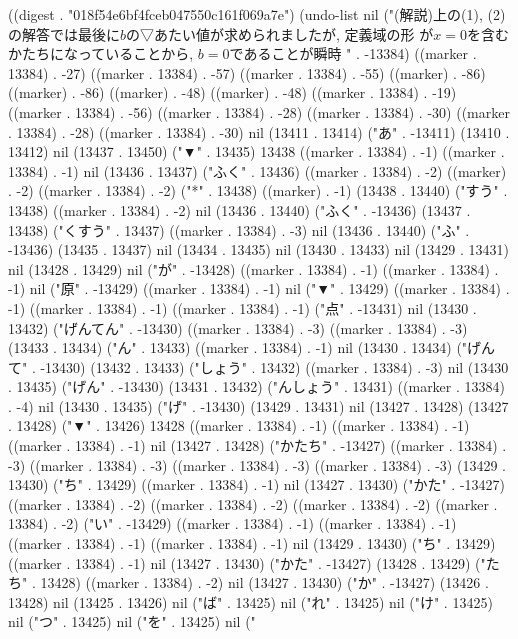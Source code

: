 
((digest . "018f54e6bf4fceb047550c161f069a7e") (undo-list nil ("(解説)上の(1), (2)の解答では最後に$b$の▽あたい値が求められましたが, 定義域の形
が$x=0$を含むかたちになっていることから, $b=0$であることが瞬時
" . -13384) ((marker . 13384) . -27) ((marker . 13384) . -57) ((marker . 13384) . -55) ((marker) . -86) ((marker) . -86) ((marker) . -48) ((marker) . -48) ((marker . 13384) . -19) ((marker . 13384) . -56) ((marker . 13384) . -28) ((marker . 13384) . -30) ((marker . 13384) . -28) ((marker . 13384) . -30) nil (13411 . 13414) ("あ" . -13411) (13410 . 13412) nil (13437 . 13450) ("▼" . 13435) 13438 ((marker . 13384) . -1) ((marker . 13384) . -1) nil (13436 . 13437) ("ふく" . 13436) ((marker . 13384) . -2) ((marker) . -2) ((marker . 13384) . -2) ("*" . 13438) ((marker) . -1) (13438 . 13440) ("すう" . 13438) ((marker . 13384) . -2) nil (13436 . 13440) ("ふく" . -13436) (13437 . 13438) ("くすう" . 13437) ((marker . 13384) . -3) nil (13436 . 13440) ("ふ" . -13436) (13435 . 13437) nil (13434 . 13435) nil (13430 . 13433) nil (13429 . 13431) nil (13428 . 13429) nil ("が" . -13428) ((marker . 13384) . -1) ((marker . 13384) . -1) nil ("原" . -13429) ((marker . 13384) . -1) nil ("▼" . 13429) ((marker . 13384) . -1) ((marker . 13384) . -1) ((marker . 13384) . -1) ("点" . -13431) nil (13430 . 13432) ("げんてん" . -13430) ((marker . 13384) . -3) ((marker . 13384) . -3) (13433 . 13434) ("ん" . 13433) ((marker . 13384) . -1) nil (13430 . 13434) ("げんて" . -13430) (13432 . 13433) ("しょう" . 13432) ((marker . 13384) . -3) nil (13430 . 13435) ("げん" . -13430) (13431 . 13432) ("んしょう" . 13431) ((marker . 13384) . -4) nil (13430 . 13435) ("げ" . -13430) (13429 . 13431) nil (13427 . 13428) (13427 . 13428) ("▼" . 13426) 13428 ((marker . 13384) . -1) ((marker . 13384) . -1) ((marker . 13384) . -1) nil (13427 . 13428) ("かたち" . -13427) ((marker . 13384) . -3) ((marker . 13384) . -3) ((marker . 13384) . -3) ((marker . 13384) . -3) (13429 . 13430) ("ち" . 13429) ((marker . 13384) . -1) nil (13427 . 13430) ("かた" . -13427) ((marker . 13384) . -2) ((marker . 13384) . -2) ((marker . 13384) . -2) ((marker . 13384) . -2) ("い" . -13429) ((marker . 13384) . -1) ((marker . 13384) . -1) ((marker . 13384) . -1) ((marker . 13384) . -1) nil (13429 . 13430) ("ち" . 13429) ((marker . 13384) . -1) nil (13427 . 13430) ("かた" . -13427) (13428 . 13429) ("たち" . 13428) ((marker . 13384) . -2) nil (13427 . 13430) ("か" . -13427) (13426 . 13428) nil (13425 . 13426) nil ("ば" . 13425) nil ("れ" . 13425) nil ("け" . 13425) nil ("つ" . 13425) nil ("を" . 13425) nil ("
